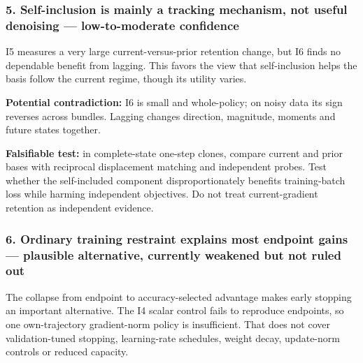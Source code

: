 \documentclass[
  british,
  10pt,
  a4paper,
]{article}
\begin{document}
\subsubsection{\texorpdfstring{5. Self-\allowbreak{}inclusion is mainly
a tracking mechanism, not useful denoising ---
low-\allowbreak{}to-\allowbreak{}moderate
confidence}{5.  is mainly a tracking mechanism, not useful denoising ---  confidence}}\label{synthesis--self-inclusion-is-mainly-a-tracking-mechanism-not-useful-denoising-low-to-moderate-confidence}

I5 measures a very large current-\allowbreak{}versus-\allowbreak{}prior
retention change, but I6 finds no dependable benefit from lagging. This
favors the view that self-\allowbreak{}inclusion helps the basis follow
the current regime, though its utility varies.

\textbf{Potential contradiction:} I6 is small and
whole-\allowbreak{}policy; on noisy data its sign reverses across
bundles. Lagging changes direction, magnitude, moments and future states
together.

\textbf{Falsifiable test:} in complete-\allowbreak{}state one-step
clones, compare current and prior bases with reciprocal displacement
matching and independent probes. Test whether the
self-\allowbreak{}included component disproportionately benefits
training-\allowbreak{}batch loss while harming independent
objectives.\allowbreak{} Do not treat current-\allowbreak{}gradient
retention as independent evidence.

\subsubsection{\texorpdfstring{6. Ordinary training restraint explains
most endpoint gains --- plausible alternative,\allowbreak{} currently
weakened but not ruled
out}{6. Ordinary training restraint explains most endpoint gains --- plausible  currently weakened but not ruled out}}\label{synthesis--ordinary-training-restraint-explains-most-endpoint-gains-plausible-alternative-currently-weakened-but-not-ruled-out}

The collapse from endpoint to accuracy-\allowbreak{}selected advantage
makes early stopping an important alternative.\allowbreak{} The I4
scalar control fails to reproduce endpoints, so one
own-\allowbreak{}trajectory gradient-\allowbreak{}norm policy is
insufficient\allowbreak{}.\allowbreak{} That does not cover
validation-\allowbreak{}tuned stopping, learning-\allowbreak{}rate
schedules, weight decay, update-\allowbreak{}norm controls or reduced
capacity.
\end{document}
